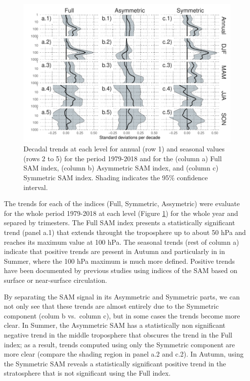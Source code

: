 \documentclass[]{ametsocV5}
\begin{document}
\begin{figure}
\includegraphics{trends-1} \caption[Decadal trends at each level for annual (row 1) and seasonal values (rows 2 to 5) for the period 1979-2018 and for the (column a) Full SAM index, (column b) Asymmetric SAM index, and (column c) Symmetric SAM index]{Decadal trends at each level for annual (row 1) and seasonal values (rows 2 to 5) for the period 1979-2018 and for the (column a) Full SAM index, (column b) Asymmetric SAM index, and (column c) Symmetric SAM index. Shading indicates the 95\% confidence interval.}\label{fig:trends}
\end{figure}

The trends for each of the indices (Full, Symmetric, Assymetric) were
evaluate for the whole period 1979-2018 at each level (Figure
\ref{fig:trends}) for the whole year and separed by trimesters. The Full
SAM index presents a statistically significant trend (panel a.1) that
extends throught the troposphere up to about 50 hPa and reaches its
maximum value at 100 hPa. The seasonal trends (rest of column a)
indicate that positive trends are present in Autumn and particularly in
in Summer, where the 100 hPa maximum is much more defined. Positive
trends have been documented by previous studies \citep[e.g.][ and
references therein]{fogt2020} using indices of the SAM based on surface
or near-surface circulation.

By separating the SAM signal in its Asymmetric and Symmetric parts, we
can not only see that these trends are almost entirely due to the
Symmetric component (colum b vs.~column c), but in some cases the trends
become more clear. In Summer, the Asymmetric SAM has a statistically non
significant negative trend in the middle troposphere that obscures the
trend in the Full index; as a result, trends computed using only the
Symmetric component are more clear (compare the shading region in panel
a.2 and c.2). In Autumn, using the Symmetric SAM reveals a statistically
significant positive trend in the stratosphere that is not significant
using the Full index.
\end{document}

